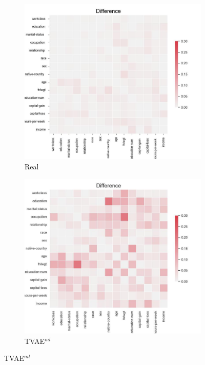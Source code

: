 \begin{figure}[h]
	\centering
	\begin{subfigure}{0.3\textwidth}
		\includegraphics[width=\textwidth]{images/correlation_difference/real.jpg}
		\caption{Real}

	\end{subfigure}
	\hfill
	\begin{subfigure}{0.3\textwidth}
		\includegraphics[width=\textwidth]{images/correlation_difference/tvae.jpg}
		\caption{TVAE$^{ml}$}


\end{subfigure}
\end{figure}
